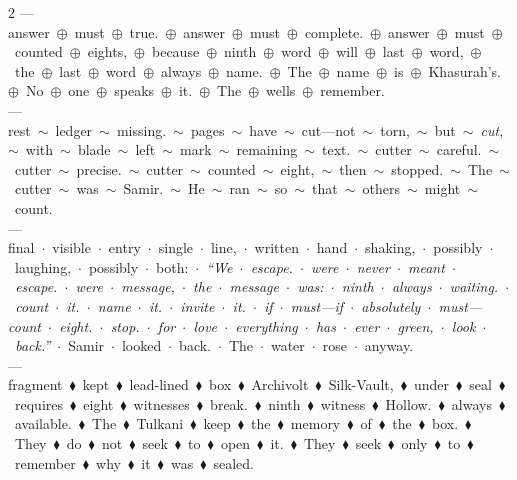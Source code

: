 \documentclass[11pt,letterpaper,twoside]{book}
\begin{document}
\begin{multicols}{2}
---\\
answer~$\oplus$~must~$\oplus$~true.~$\oplus$~answer~$\oplus$~must~$\oplus$~complete.~$\oplus$~answer~$\oplus$~must~$\oplus$~counted~$\oplus$~eights,~$\oplus$~because~$\oplus$~ninth~$\oplus$~word~$\oplus$~will~$\oplus$~last~$\oplus$~word,~$\oplus$~the~$\oplus$~last~$\oplus$~word~$\oplus$~always~$\oplus$~name.~$\oplus$~The~$\oplus$~name~$\oplus$~is~$\oplus$~Khasurah's.~$\oplus$~No~$\oplus$~one~$\oplus$~speaks~$\oplus$~it.~$\oplus$~The~$\oplus$~wells~$\oplus$~remember.\\[0.5ex]
---\\
rest~$\sim$~ledger~$\sim$~missing.~$\sim$~pages~$\sim$~have~$\sim$~cut---not~$\sim$~torn,~$\sim$~but~$\sim$~\textit{cut},~$\sim$~with~$\sim$~blade~$\sim$~left~$\sim$~mark~$\sim$~remaining~$\sim$~text.~$\sim$~cutter~$\sim$~careful.~$\sim$~cutter~$\sim$~precise.~$\sim$~cutter~$\sim$~counted~$\sim$~eight,~$\sim$~then~$\sim$~stopped.~$\sim$~The~$\sim$~cutter~$\sim$~was~$\sim$~Samir.~$\sim$~He~$\sim$~ran~$\sim$~so~$\sim$~that~$\sim$~others~$\sim$~might~$\sim$~count.\\[0.5ex]
---\\
final~$\cdot$~visible~$\cdot$~entry~$\cdot$~single~$\cdot$~line,~$\cdot$~written~$\cdot$~hand~$\cdot$~shaking,~$\cdot$~possibly~$\cdot$~laughing,~$\cdot$~possibly~$\cdot$~both:~$\cdot$~\textit{``We~$\cdot$~escape.~$\cdot$~were~$\cdot$~never~$\cdot$~meant~$\cdot$~escape.~$\cdot$~were~$\cdot$~message,~$\cdot$~the~$\cdot$~message~$\cdot$~was:~$\cdot$~ninth~$\cdot$~always~$\cdot$~waiting.~$\cdot$~count~$\cdot$~it.~$\cdot$~name~$\cdot$~it.~$\cdot$~invite~$\cdot$~it.~$\cdot$~if~$\cdot$~must---if~$\cdot$~absolutely~$\cdot$~must---count~$\cdot$~eight.~$\cdot$~stop.~$\cdot$~for~$\cdot$~love~$\cdot$~everything~$\cdot$~has~$\cdot$~ever~$\cdot$~green,~$\cdot$~look~$\cdot$~back.''}~$\cdot$~Samir~$\cdot$~looked~$\cdot$~back.~$\cdot$~The~$\cdot$~water~$\cdot$~rose~$\cdot$~anyway.\\[0.5ex]
---\\
fragment~$\blacklozenge$~kept~$\blacklozenge$~lead-lined~$\blacklozenge$~box~$\blacklozenge$~Archivolt~$\blacklozenge$~Silk-Vault,~$\blacklozenge$~under~$\blacklozenge$~seal~$\blacklozenge$~requires~$\blacklozenge$~eight~$\blacklozenge$~witnesses~$\blacklozenge$~break.~$\blacklozenge$~ninth~$\blacklozenge$~witness~$\blacklozenge$~Hollow.~$\blacklozenge$~always~$\blacklozenge$~available.~$\blacklozenge$~The~$\blacklozenge$~Tulkani~$\blacklozenge$~keep~$\blacklozenge$~the~$\blacklozenge$~memory~$\blacklozenge$~of~$\blacklozenge$~the~$\blacklozenge$~box.~$\blacklozenge$~They~$\blacklozenge$~do~$\blacklozenge$~not~$\blacklozenge$~seek~$\blacklozenge$~to~$\blacklozenge$~open~$\blacklozenge$~it.~$\blacklozenge$~They~$\blacklozenge$~seek~$\blacklozenge$~only~$\blacklozenge$~to~$\blacklozenge$~remember~$\blacklozenge$~why~$\blacklozenge$~it~$\blacklozenge$~was~$\blacklozenge$~sealed.
\end{multicols}
\end{document}
